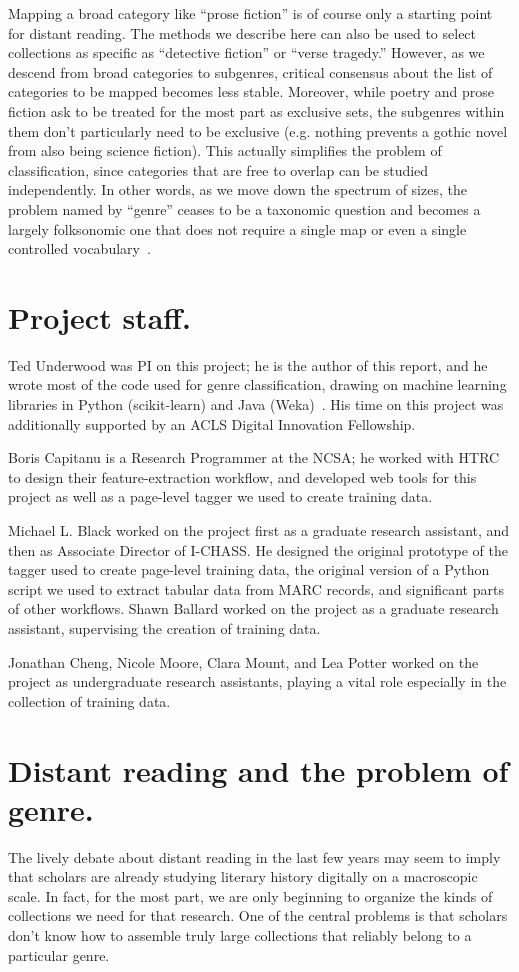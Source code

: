 \documentclass[paper=a4, fontsize=12pt]{scrartcl}
\numberwithin{equation}{section}		%
\numberwithin{figure}{section}			%
\numberwithin{table}{section}				%
\begin{document}
Mapping a broad category like ``prose fiction'' is of course only a starting point for distant reading. The methods we describe here can also be used to select collections as specific as ``detective fiction'' or ``verse tragedy.'' However, as we descend from broad categories to subgenres, critical consensus about the list of categories to be mapped becomes less stable. Moreover, while poetry and prose fiction ask to be treated for the most part as exclusive sets, the subgenres within them don't particularly need to be exclusive (e.g. nothing prevents a gothic novel from also being science fiction). This actually simplifies the problem of classification, since categories that are free to overlap can be studied independently. In other words, as we move down the spectrum of sizes, the problem named by ``genre'' ceases to be a taxonomic question and becomes a largely folksonomic one that does not require a single map or even a single controlled vocabulary~\cite{vanderwal:folksonomy}.

\section{Project staff.}
Ted Underwood was PI on this project; he is the author of this report, and he wrote most of the code used for genre classification, drawing on machine learning libraries in Python (scikit-learn) and Java (Weka)~\cite{scikit-learn, weka}. His time on this project was additionally supported by an ACLS Digital Innovation Fellowship.

Boris Capitanu is a Research Programmer at the NCSA; he worked with HTRC to design their feature-extraction workflow, and developed web tools for this project as well as a page-level tagger we used to create training data.

Michael L. Black worked on the project first as a graduate research assistant, and then as Associate Director of I-CHASS. He designed the original prototype of the tagger used to create page-level training data, the original version of a Python script we used to extract tabular data from MARC records, and significant parts of other workflows. Shawn Ballard worked on the project as a graduate research assistant, supervising the creation of training data.

Jonathan Cheng, Nicole Moore, Clara Mount, and Lea Potter worked on the project as undergraduate research assistants, playing a vital role especially in the collection of training data.

\newpage
\section{Distant reading and the problem of genre.}
The lively debate about distant reading in the last few years may seem to imply that scholars are already studying literary history digitally on a macroscopic scale. In fact, for the most part, we are only beginning to organize the kinds of collections we need for that research. One of the central problems is that scholars don't know how to assemble truly large collections that reliably belong to a particular genre.
\end{document}

